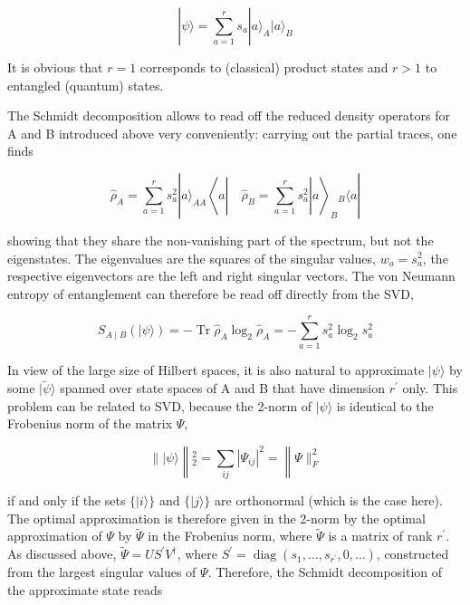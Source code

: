 \documentclass[12pt]{article}
\begin{document}
\begin{equation*}
|\psi\rangle=\sum_{a=1}^{r} s_{a}|a\rangle_{A}|a\rangle_{B} \tag{23}
\end{equation*}


It is obvious that $r=1$ corresponds to (classical) product states and $r>1$ to entangled (quantum) states.

The Schmidt decomposition allows to read off the reduced density operators for A and B introduced above very conveniently: carrying out the partial traces, one finds


\begin{equation*}
\hat{\rho}_{A}=\sum_{a=1}^{r} s_{a}^{2}|a\rangle_{A A}\left\langle a\left|\quad \hat{\rho}_{B}=\sum_{a=1}^{r} s_{a}^{2}\right| a\right\rangle_{B}{ }_{B}\langle a| \tag{24}
\end{equation*}


showing that they share the non-vanishing part of the spectrum, but not the eigenstates. The eigenvalues are the squares of the singular values, $w_{a}=s_{a}^{2}$, the respective eigenvectors are the left and right singular vectors. The von Neumann entropy of entanglement can therefore be read off directly from the SVD,


\begin{equation*}
S_{A \mid B}(|\psi\rangle)=-\operatorname{Tr} \hat{\rho}_{A} \log _{2} \hat{\rho}_{A}=-\sum_{a=1}^{r} s_{a}^{2} \log _{2} s_{a}^{2} \tag{25}
\end{equation*}


In view of the large size of Hilbert spaces, it is also natural to approximate $|\psi\rangle$ by some $|\tilde{\psi}\rangle$ spanned over state spaces of A and B that have dimension $r^{\prime}$ only. This problem can be related to SVD, because the 2-norm of $|\psi\rangle$ is identical to the Frobenius norm of the matrix $\Psi$,


\begin{equation*}
\||\psi\rangle\left\|_{2}^{2}=\sum_{i j}\left|\Psi_{i j}\right|^{2}=\right\| \Psi \|_{F}^{2} \tag{26}
\end{equation*}


if and only if the sets $\{|i\rangle\}$ and $\{|j\rangle\}$ are orthonormal (which is the case here). The optimal approximation is therefore given in the 2-norm by the optimal approximation of $\Psi$ by $\tilde{\Psi}$ in the Frobenius norm, where $\tilde{\Psi}$ is a matrix of rank $r^{\prime}$. As discussed above, $\tilde{\Psi}=U S^{\prime} V^{\dagger}$, where $S^{\prime}=\operatorname{diag}\left(s_{1}, \ldots, s_{r^{\prime}}, 0, \ldots\right)$, constructed from the largest singular values of $\Psi$. Therefore, the Schmidt decomposition of the approximate state reads
\end{document}
